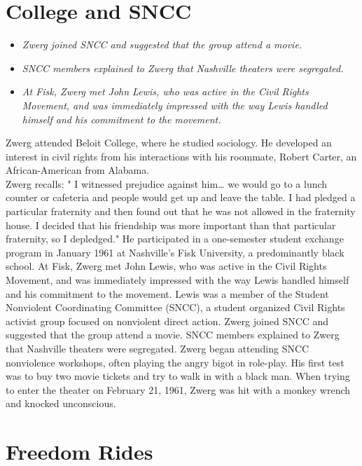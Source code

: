 \section{College and SNCC}\label{college-and-sncc}

\begin{itemize}
\item
  \emph{Zwerg joined SNCC and suggested that the group attend a movie.}
\item
  \emph{SNCC members explained to Zwerg that Nashville theaters were
  segregated.}
\item
  \emph{At Fisk, Zwerg met John Lewis, who was active in the Civil
  Rights Movement, and was immediately impressed with the way Lewis
  handled himself and his commitment to the movement.}
\end{itemize}

Zwerg attended Beloit College, where he studied sociology. He developed
an interest in civil rights from his interactions with his roommate,
Robert Carter, an African-American from Alabama.\\
Zwerg recalls: " I witnessed prejudice against him\ldots{} we would go
to a lunch counter or cafeteria and people would get up and leave the
table. I had pledged a particular fraternity and then found out that he
was not allowed in the fraternity house. I decided that his friendship
was more important than that particular fraternity, so I depledged." He
participated in a one-semester student exchange program in January 1961
at Nashville's Fisk University, a predominantly black school. At Fisk,
Zwerg met John Lewis, who was active in the Civil Rights Movement, and
was immediately impressed with the way Lewis handled himself and his
commitment to the movement. Lewis was a member of the Student Nonviolent
Coordinating Committee (SNCC), a student organized Civil Rights activist
group focused on nonviolent direct action. Zwerg joined SNCC and
suggested that the group attend a movie. SNCC members explained to Zwerg
that Nashville theaters were segregated. Zwerg began attending SNCC
nonviolence workshops, often playing the angry bigot in role-play. His
first test was to buy two movie tickets and try to walk in with a black
man. When trying to enter the theater on February 21, 1961, Zwerg was
hit with a monkey wrench and knocked unconscious.

\section{Freedom Rides}\label{freedom-rides}

